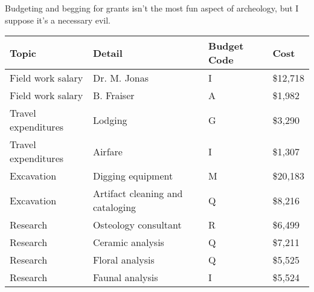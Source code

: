 Budgeting and begging for grants isn't the most fun aspect of
archeology, but I suppose it's a necessary evil.

\begin{center}
\begin{tabular}{llll}
\textbf{Topic}      & \textbf{Detail}                  & \textbf{Budget Code} & \textbf{Cost}     \\\hline
Field work salary   & Dr. M. Jonas                     & I           & \$12,718 \\
Field work salary   & B. Fraiser                       & A           & \$1,982  \\
Travel expenditures & Lodging                          & G           & \$3,290  \\
Travel expenditures & Airfare                          & I           & \$1,307  \\
Excavation          & Digging equipment                & M           & \$20,183 \\
Excavation          & Artifact cleaning and cataloging & Q           & \$8,216  \\
Research            & Osteology consultant             & R           & \$6,499  \\
Research            & Ceramic analysis                 & Q           & \$7,211  \\
Research            & Floral analysis                  & Q           & \$5,525  \\
Research            & Faunal analysis                  & I           & \$5,524 
\end{tabular}
\end{center}
